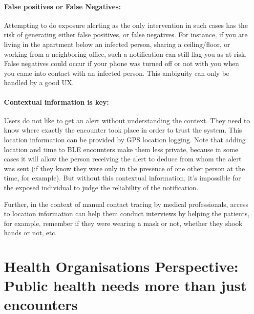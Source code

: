 \documentclass[11pt]{article}
\begin{document}
\paragraph{False positives or False Negatives:} Attempting to do exposure alerting as the only intervention in such cases has the risk of generating either false positives, or false negatives. For instance, if you are  living in the apartment below an infected person, sharing a ceiling/floor, or working from a neighboring office, such a notification can still flag you as at risk. False negatives could occur if your phone was turned off or not with you when you came into contact with an infected person. This ambiguity can only be handled by a good UX.



\paragraph{Contextual information is key:} Users do not like to get an alert without understanding the context. They need to know where exactly the encounter took place in order to trust the system. This location information can be provided by GPS location logging. Note that adding location and time to BLE encounters make them less private, because in some cases it will allow the person receiving the alert to deduce from whom the alert was sent (if they know they were only in the presence of one other person at the time, for example). But without this contextual information, it’s impossible for the exposed individual to judge the reliability of the notification.

Further, in the context of manual contact tracing by medical professionals, access to location information can help them conduct interviews by helping the patients, for example, remember if they were wearing a mask or not, whether they shook hands or not, etc.


\section{Health Organisations Perspective: Public health needs more than just encounters}
\end{document}
